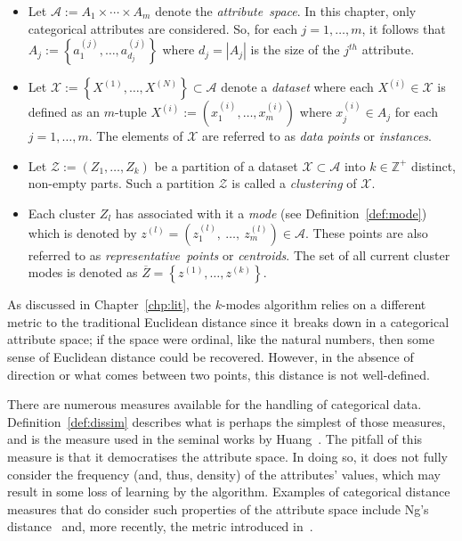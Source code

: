 \begin{itemize}
    \item Let \(\mathcal{A} := A_1 \times \cdots \times A_m\) denote the
        \emph{attribute~space}. In this chapter, only categorical attributes are
        considered. So, for each \(j = 1, \ldots, m\), it follows that
        \(A_j := \left\{a_1^{(j)}, \ldots, a_{d_j}^{(j)}\right\}\) where
        \(d_j=|A_j|\) is the size of the \(j^{th}\) attribute.

    \item Let \(\mathcal{X} := \left\{X^{(1)}, \ldots, X^{(N)}\right\} \subset
        \mathcal{A}\) denote a \emph{dataset} where each \(X^{(i)} \in
        \mathcal{X}\) is defined as an \(m\)-tuple \(X^{(i)} := \left(x_1^{(i)},
        \ldots, x_m^{(i)}\right)\) where \(x_j^{(i)} \in A_j\) for each \(j = 1,
        \ldots, m\). The elements of \(\mathcal{X}\) are referred to as
        \emph{data points} or \emph{instances}.
    \item Let \(\mathcal{Z} := \left(Z_1, \ldots, Z_k\right)\) be a partition
        of a dataset \(\mathcal{X} \subset \mathcal A\) into \(k \in
        \mathbb{Z}^{+}\) distinct, non-empty parts. Such a partition
        \(\mathcal{Z}\) is called a \emph{clustering} of \(\mathcal{X}\).

    \item Each cluster \(Z_l\) has associated with it a
        \emph{mode} (see Definition~\ref{def:mode}) which is
        denoted by \(z^{(l)} = \left(z_1^{(l)},~\ldots,~z_m^{(l)}\right) \in
        \mathcal{A}\).  These points are also referred to as
        \emph{representative~points} or \emph{centroids}. The set of all current
        cluster modes is denoted as \(\overline Z = \left\{z^{(1)}, \ldots,
        z^{(k)}\right\}\).
\end{itemize}

As discussed in Chapter~\ref{chp:lit}, the \(k\)-modes algorithm relies on a
different metric to the traditional Euclidean distance since it breaks down in a
categorical attribute space; if the space were ordinal, like the natural
numbers, then some sense of Euclidean distance could be recovered. However, in
the absence of direction or what comes between two points, this distance is not
well-defined.

There are numerous measures available for the handling of categorical data.
Definition~\ref{def:dissim} describes what is perhaps the simplest of those
measures, and is the measure used in the seminal works by
Huang~\cite{Huang1997a,Huang1997b,Huang1998}. The pitfall of this measure is
that it democratises the attribute space. In doing so, it does not fully
consider the frequency (and, thus, density) of the attributes' values, which may
result in some loss of learning by the algorithm. Examples of categorical
distance measures that do consider such properties of the attribute space
include Ng's distance~\cite{Ng2007} and, more recently, the metric introduced
in~\cite{Cao2012}.

